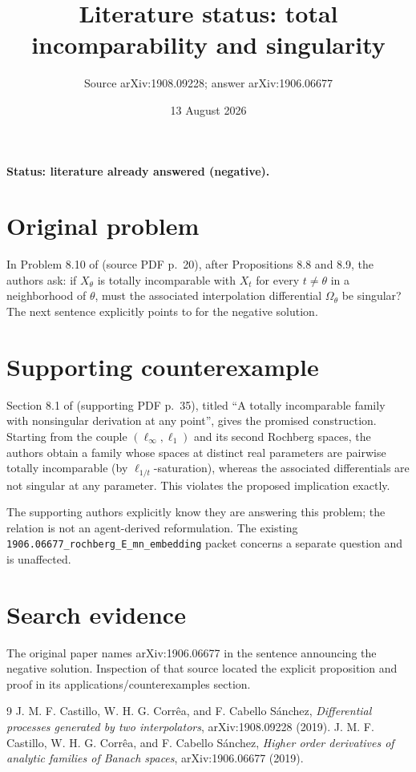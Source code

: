 \documentclass[11pt]{article}
\title{Literature status: total incomparability and singularity}
\author{Source arXiv:1908.09228; answer arXiv:1906.06677}
\date{13 August 2026}
\begin{document}
\maketitle
\noindent\textbf{Status: literature already answered (negative).}

\section*{Original problem}
In Problem 8.10 of \cite{DPTI} (source PDF p.~20), after Propositions 8.8
and 8.9, the authors ask:
if $X_\theta$ is totally incomparable with $X_t$ for every
$t\ne\theta$ in a neighborhood of $\theta$, must the associated
interpolation differential $\Omega_\theta$ be singular?  The next sentence
explicitly points to \cite{HOD} for the negative solution.

\section*{Supporting counterexample}
Section 8.1 of \cite{HOD} (supporting PDF p.~35), titled ``A totally incomparable family with
nonsingular derivation at any point'', gives the promised construction.
Starting from the couple $(\ell_\infty,\ell_1)$ and its second Rochberg
spaces, the authors obtain a family whose spaces at distinct real parameters
are pairwise totally incomparable (by $\ell_{1/t}$-saturation), whereas the
associated differentials are not singular at any parameter.  This violates
the proposed implication exactly.

The supporting authors explicitly know they are answering this problem; the
relation is not an agent-derived reformulation.  The existing
\texttt{1906.06677\_rochberg\_E\_mn\_embedding} packet concerns a separate question and
is unaffected.

\section*{Search evidence}
The original paper names arXiv:1906.06677 in the sentence announcing the
negative solution.  Inspection of that source located the explicit
proposition and proof in its applications/counterexamples section.

\begin{thebibliography}{9}
 J. M. F. Castillo, W. H. G. Corr\^ea, and F. Cabello S\'anchez,
\emph{Differential processes generated by two interpolators},
arXiv:1908.09228 (2019).
 J. M. F. Castillo, W. H. G. Corr\^ea, and F. Cabello S\'anchez,
\emph{Higher order derivatives of analytic families of Banach spaces},
arXiv:1906.06677 (2019).
\end{thebibliography}
\end{document}
